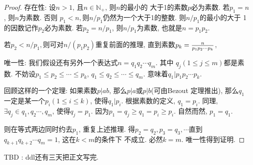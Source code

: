 \begin{proof}
    存在性: 设$n>1$, 且$n\in \mathbb N_+$, 则$n$的最小的
    大于1的素数$p$必为素数. 若$p_1=n$, 则$n$为素数. 否则
    $p_1<n, $则$n/p_1$仍然为一个大于1的整数. 则$n/p_1$的最小的大于
    1的因数记作$p_2$必为素数. 若$p_2=n/p_1$, 
    则$n/p_1$为素数, 也就是$n=p_1p_2$. 

    若$p_2<n/p_1,$则可对$n/(p_1p_2)$重复前面的推理, 直到素数$p_k={n\over p_1p_2\cdots p_k}$,

    唯一性: 我们假设还有另外一个表达式$n=q_1q_2\cdots q_m$. 其中 
    $q_j(1\leq j\leq m)$都是素数. 不妨设$p_1\leq p_2\leq \cdots\leq p_k$,
    $q_1\leq q_2\leq \cdots\leq q_m$. 意味着$q_1|p_1p_2\cdots p_k$.

    回顾这样的一个定理: 如果素数$p|ab$, 那么$p|a$或$p|b$(可由Bezout
    定理推出), 那么$q_1$一定是某一个$p_i(1\leq i\leq k)$, 使得$q_1|p_i$. 
    根据素数的定义, $q_1=p_i$. 同理, $\exists q_j\in {q_1, q_2\cdots,q_m}$, 
    使得$q_j=p_1$. 因为$p_1=q_j\geq q_1=p_i\geq p_i$. 自然而然, $p_1=q_1$. 

    则在等式两边同时约去$p_1$, 重复上述推理. 得$p_2=q_2, p_3=q_3,
    \cdots$直到$q_{k+1}q_{k+2}\cdots q_m=1$, 这在$k<m$的条件下
    不成立. 必然$k=m.$ 唯一性得到证明. 
\end{proof}


TBD : ddl还有三天把正文写完. 